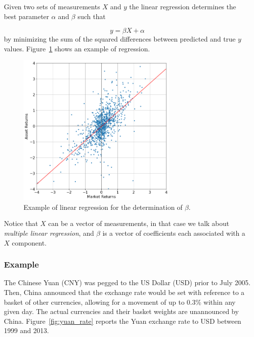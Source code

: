 Given two sets of measurements $X$ and $y$ the linear regression determines the best parameter $\alpha$ and $\beta$ such that

\begin{equation}
y=\beta X + \alpha
\end{equation}
by minimizing the sum of the squared differences between predicted and true $y$ values.
Figure~\ref{fig:linear_regression} shows an example of regression.

\begin{figure}[htbp]
	\centering
	\includegraphics[width=0.7\textwidth]{figures/linear_regression}
	\caption{Example of linear regression for the determination of $\beta$.}
	\label{fig:linear_regression}
\end{figure}

Notice that $X$ can be a vector of measurements, in that case we talk about \emph{multiple linear regression}, and $\beta$ is a vector of coefficients each associated with a $X$ component. 
 
\subsubsection{Example}

The Chinese Yuan (CNY) was pegged to the US Dollar (USD) prior to July 2005. Then, China announced that the exchange rate would be set with reference to a basket of other currencies, allowing for a movement of up to 0.3\% within any given day. The actual currencies and their basket weights are unannounced by China. Figure~\ref{fig:yuan_rate} reports the Yuan exchange rate to USD between 1999 and 2013.

